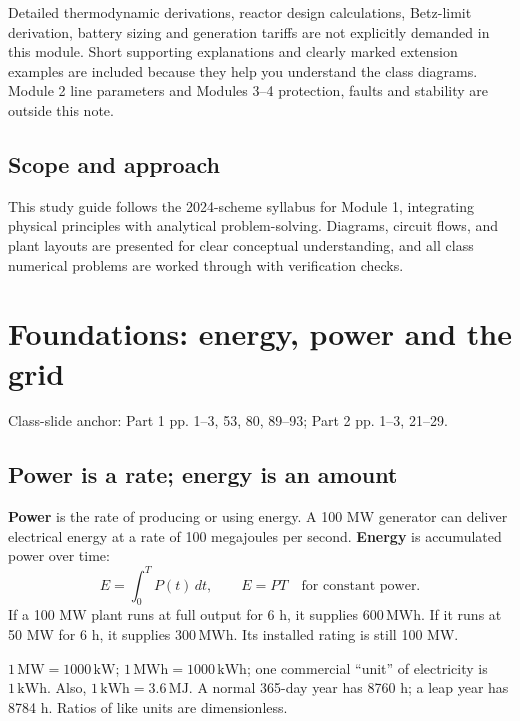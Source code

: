 \documentclass[11pt,a4paper]{article}
\newenvironment{Idea}[1]{\begin{tcolorbox}[colback=pale,colframe=teal,coltitle=white,title={#1}]}{\end{tcolorbox}}
\newenvironment{Caution}[1]{\begin{tcolorbox}[colback=warm,colframe=rust,coltitle=white,title={#1}]}{\end{tcolorbox}}
\newcommand{\slides}[1]{{\small\color{muted}\textsf{Class-slide anchor: #1.}}\par}
\newcommand{\chapterstart}[2]{\clearpage\section{#1}\label{#2}}
\begin{document}
\begin{Caution}{Core syllabus and added understanding}
Detailed thermodynamic derivations, reactor design calculations, Betz-limit derivation, battery sizing and generation tariffs are not explicitly demanded in this module. Short supporting explanations and clearly marked extension examples are included because they help you understand the class diagrams. Module 2 line parameters and Modules 3--4 protection, faults and stability are outside this note.
\end{Caution}

\subsection{Scope and approach}
This study guide follows the 2024-scheme syllabus for Module 1, integrating physical principles with analytical problem-solving. Diagrams, circuit flows, and plant layouts are presented for clear conceptual understanding, and all class numerical problems are worked through with verification checks.

\chapterstart{Foundations: energy, power and the grid}{foundations}
\slides{Part 1 pp. 1--3, 53, 80, 89--93; Part 2 pp. 1--3, 21--29}
\subsection{Power is a rate; energy is an amount}
\textbf{Power} is the rate of producing or using energy. A 100 MW generator can deliver electrical energy at a rate of 100 megajoules per second. \textbf{Energy} is accumulated power over time:
\[
E=\int_0^T P(t)\,dt,\qquad E=P T\quad\text{for constant power.}
\]
If a 100 MW plant runs at full output for 6 h, it supplies $600\,\mathrm{MWh}$. If it runs at 50 MW for 6 h, it supplies $300\,\mathrm{MWh}$. Its installed rating is still 100 MW.
\begin{Idea}{Units you must keep separate}
$1\,\mathrm{MW}=1000\,\mathrm{kW}$; $1\,\mathrm{MWh}=1000\,\mathrm{kWh}$; one commercial ``unit'' of electricity is $1\,\mathrm{kWh}$. Also, $1\,\mathrm{kWh}=3.6\,\mathrm{MJ}$. A normal 365-day year has 8760 h; a leap year has 8784 h. Ratios of like units are dimensionless.
\end{Idea}
\end{document}
